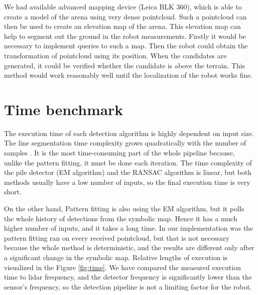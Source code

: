 We had available advanced mapping device (Leica BLK 360), which is able to create a model of the arena using very dense pointcloud. Such a pointcloud can then be used to create an elevation map of the arena. This elevation map can help to segment out the ground in the robot measurements. Firstly it would be necessary to implement queries to such a map. Then the robot could obtain the transformation of pointcloud using its position. When the candidates are generated, it could be verified whether the candidate is above the terrain. This method would work reasonably well until the localization of the robot works fine.

\section{Time benchmark}
The execution time of each detection algorithm is highly dependent on input size. The line segmentation time complexity grows quadratically with the number of samples \cite{hershberger2000}. It is the most time-consuming part of the whole pipeline because, unlike the pattern fitting, it must be done each iteration. The time complexity of the pile detector (EM algorithm) and the RANSAC algorithm is linear, but both methods usually have a low number of inputs, so the final execution time is very short. 

On the other hand, Pattern fitting is also using the EM algorithm, but it polls the whole history of detections from the symbolic map. Hence it has a much higher number of inputs, and it takes a long time. In our implementation was the pattern fitting ran on every received pointcloud, but that is not necessary because the whole method is deterministic, and the results are different only after a significant change in the symbolic map. Relative lengths of execution is visualized in the Figure \ref{fig:time}. We have compared the measured execution time to lidar frequency, and the detector frequency is significantly lower than the sensor's frequency, so the detection pipeline is not a limiting factor for the robot.

